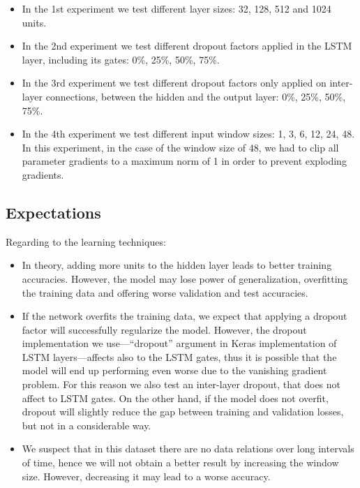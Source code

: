 \documentclass[]{article}
\begin{document}
	\begin{itemize}
		\item In the 1st experiment we test different layer sizes: 32, 128, 512 and 1024 units.
		
		\item In the 2nd experiment we test different dropout factors applied in the LSTM layer, including its gates: 0\%, 25\%, 50\%, 75\%.
		
		\item In the 3rd experiment we test different dropout factors only applied on inter-layer connections, between the hidden and the output layer: 0\%, 25\%, 50\%, 75\%.
		
		\item In the 4th experiment we test different input window sizes: 1, 3, 6, 12, 24, 48. In this experiment, in the case of the window size of 48, we had to clip all parameter gradients to a maximum norm of 1 in order to prevent exploding gradients.
	\end{itemize}
	
	\subsection{Expectations}
	
	Regarding to the learning techniques:
	
	\begin{itemize}
		\item In theory, adding more units to the hidden layer leads to better training accuracies. However, the model may lose power of generalization, overfitting the training data and offering worse validation and test accuracies.
		
		\item If the network overfits the training data, we expect that applying a dropout factor will successfully regularize the model. However, the dropout implementation we use---``dropout'' argument in Keras implementation of LSTM layers---affects also to the LSTM gates, thus it is possible that the model will end up performing even worse due to the vanishing gradient problem. For this reason we also test an inter-layer dropout, that does not affect to LSTM gates. On the other hand, if the model does not overfit, dropout will slightly reduce the gap between training and validation losses, but not in a considerable way.
		
		\item We suspect that in this dataset there are no data relations over long intervals of time, hence we will not obtain a better result by increasing the window size. However, decreasing it may lead to a worse accuracy.
	\end{itemize}
	
\end{document}
